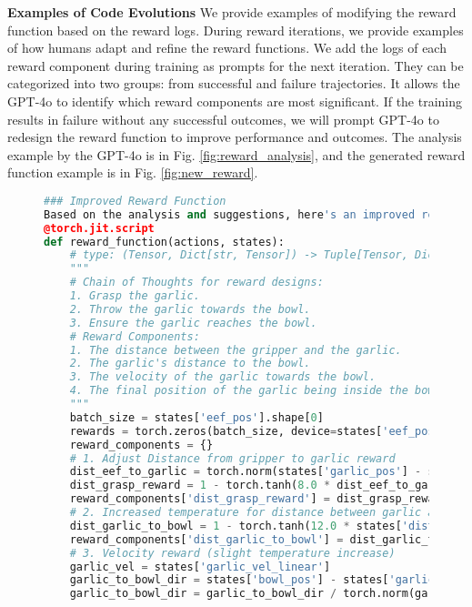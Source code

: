 \textbf{Examples of Code Evolutions} We provide examples of modifying the reward function based on the reward logs. During reward iterations, we provide examples of how humans adapt and refine the reward functions. We add the logs of each reward component during training as prompts for the next iteration. They can be categorized into two groups: from successful and failure trajectories. It allows the GPT-4o to identify which reward components are most significant. If the training results in failure without any successful outcomes, we will prompt GPT-4o to redesign the reward function to improve performance and outcomes. The analysis example by the GPT-4o is in Fig. \ref{fig:reward_analysis}, and the generated reward function example is in Fig. \ref{fig:new_reward}. 

\begin{figure}[t]
\centering
\begin{lstlisting}[language=Python]
### Improved Reward Function
Based on the analysis and suggestions, here's an improved reward function:
@torch.jit.script
def reward_function(actions, states):
    # type: (Tensor, Dict[str, Tensor]) -> Tuple[Tensor, Dict[str, torch.Tensor]]
    """
    # Chain of Thoughts for reward designs:
    1. Grasp the garlic.
    2. Throw the garlic towards the bowl.
    3. Ensure the garlic reaches the bowl.
    # Reward Components:
    1. The distance between the gripper and the garlic.
    2. The garlic's distance to the bowl.
    3. The velocity of the garlic towards the bowl.
    4. The final position of the garlic being inside the bowl.
    """
    batch_size = states['eef_pos'].shape[0]
    rewards = torch.zeros(batch_size, device=states['eef_pos'].device, dtype=torch.float32)
    reward_components = {}
    # 1. Adjust Distance from gripper to garlic reward
    dist_eef_to_garlic = torch.norm(states['garlic_pos'] - states['eef_pos'], dim=-1)
    dist_grasp_reward = 1 - torch.tanh(8.0 * dist_eef_to_garlic)  # Adjusting TANH temperature
    reward_components['dist_grasp_reward'] = dist_grasp_reward * 0.15  # Updated scale for emphasis
    # 2. Increased temperature for distance between garlic and bowl
    dist_garlic_to_bowl = 1 - torch.tanh(12.0 * states['dist_garlic_to_bowl'])  # Increased temperature for better gradient
    reward_components['dist_garlic_to_bowl'] = dist_garlic_to_bowl * 0.25  # Increased scale to 0.25
    # 3. Velocity reward (slight temperature increase)
    garlic_vel = states['garlic_vel_linear']
    garlic_to_bowl_dir = states['bowl_pos'] - states['garlic_pos']
    garlic_to_bowl_dir = garlic_to_bowl_dir / torch.norm(garlic_to_bowl_dir, dim=-1, keepdim=True)

\end{lstlisting}
\end{figure}
